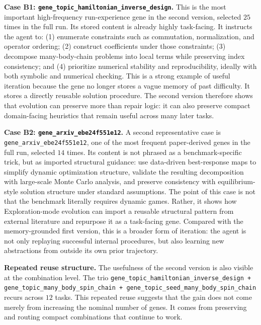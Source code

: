 \documentclass{article}
\newcommand{\nbf}[1]{{\noindent \textbf{#1}}}
\begin{document}
\nbf{Case B1: \texttt{gene\_topic\_hamiltonian\_inverse\_design}.}
This is the most important high-frequency run-experience gene in the second version, selected $25$ times in the full run.
Its stored content is already highly task-facing.
It instructs the agent to:
(1) enumerate constraints such as commutation, normalization, and operator ordering;
(2) construct coefficients under those constraints;
(3) decompose many-body-chain problems into local terms while preserving index consistency; and
(4) prioritize numerical stability and reproducibility, ideally with both symbolic and numerical checking.
This is a strong example of useful iteration because the gene no longer stores a vague memory of past difficulty.
It stores a directly reusable solution procedure.
The second version therefore shows that evolution can preserve more than repair logic:
it can also preserve compact domain-facing heuristics that remain useful across many later tasks.

\nbf{Case B2: \texttt{gene\_arxiv\_ebe24f551e12}.}
A second representative case is \texttt{gene\_arxiv\_ebe24f551e12}, one of the most frequent paper-derived genes in the full run, selected $14$ times.
Its content is not phrased as a benchmark-specific trick, but as imported structural guidance:
use data-driven best-response maps to simplify dynamic optimization structure, validate the resulting decomposition with large-scale Monte Carlo analysis, and preserve consistency with equilibrium-style solution structure under standard assumptions.
The point of this case is not that the benchmark literally requires dynamic games.
Rather, it shows how Exploration-mode evolution can import a reusable structural pattern from external literature and repurpose it as a task-facing gene.
Compared with the memory-grounded first version, this is a broader form of iteration:
the agent is not only replaying successful internal procedures, but also learning new abstractions from outside its own prior trajectory.

\nbf{Repeated reuse structure.}
The usefulness of the second version is also visible at the combination level.
The trio
\texttt{gene\_topic\_hamiltonian\_inverse\_design + gene\_topic\_many\_body\_spin\_chain + gene\_topic\_seed\_many\_body\_spin\_chain}
recurs across $12$ tasks.
This repeated reuse suggests that the gain does not come merely from increasing the nominal number of genes.
It comes from preserving and routing compact combinations that continue to work.
\end{document}
